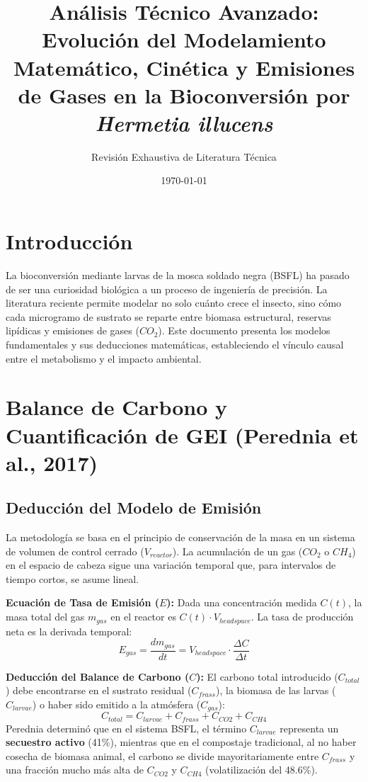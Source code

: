 \documentclass{article}
\title{Análisis Técnico Avanzado: Evolución del Modelamiento Matemático, Cinética y Emisiones de Gases en la Bioconversión por \textit{Hermetia illucens}}
\author{Revisión Exhaustiva de Literatura Técnica}
\date{\today}
\begin{document}
\maketitle

\section{Introducción}
La bioconversión mediante larvas de la mosca soldado negra (BSFL) ha pasado de ser una curiosidad biológica a un proceso de ingeniería de precisión. La literatura reciente permite modelar no solo cuánto crece el insecto, sino cómo cada microgramo de sustrato se reparte entre biomasa estructural, reservas lipídicas y emisiones de gases ($CO_2$). Este documento presenta los modelos fundamentales y sus deducciones matemáticas, estableciendo el vínculo causal entre el metabolismo y el impacto ambiental.

\section{Balance de Carbono y Cuantificación de GEI (Perednia et al., 2017)}

\subsection{Deducción del Modelo de Emisión}
La metodología se basa en el principio de conservación de la masa en un sistema de volumen de control cerrado ($V_{reactor}$). La acumulación de un gas ($CO_2$ o $CH_4$) en el espacio de cabeza sigue una variación temporal que, para intervalos de tiempo cortos, se asume lineal.

\textbf{Ecuación de Tasa de Emisión ($E$):}
Dada una concentración medida $C(t)$, la masa total del gas $m_{gas}$ en el reactor es $C(t) \cdot V_{headspace}$. La tasa de producción neta es la derivada temporal:
\begin{equation}
    E_{gas} = \frac{dm_{gas}}{dt} = V_{headspace} \cdot \frac{\Delta C}{\Delta t}
\end{equation}

\textbf{Deducción del Balance de Carbono ($C$):}
El carbono total introducido ($C_{total}$) debe encontrarse en el sustrato residual ($C_{frass}$), la biomasa de las larvas ($C_{larvae}$) o haber sido emitido a la atmósfera ($C_{gas}$):
\begin{equation}
    C_{total} = C_{larvae} + C_{frass} + C_{CO2} + C_{CH4}
\end{equation}
Perednia determinó que en el sistema BSFL, el término $C_{larvae}$ representa un \textbf{secuestro activo} (41\%), mientras que en el compostaje tradicional, al no haber cosecha de biomasa animal, el carbono se divide mayoritariamente entre $C_{frass}$ y una fracción mucho más alta de $C_{CO2}$ y $C_{CH4}$ (volatilización del 48.6\%).
\end{document}
